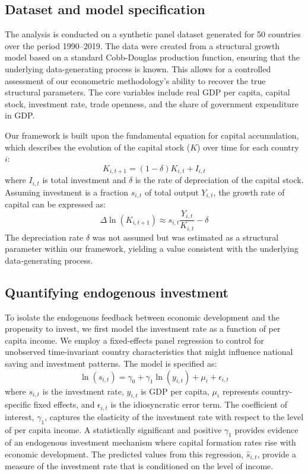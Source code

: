 \documentclass[]{article}
\begin{document}
\subsection{Dataset and model specification}
The analysis is conducted on a synthetic panel dataset generated for 50 countries over the period 1990--2019. The data were created from a structural growth model based on a standard Cobb-Douglas production function, ensuring that the underlying data-generating process is known. This allows for a controlled assessment of our econometric methodology's ability to recover the true structural parameters. The core variables include real GDP per capita, capital stock, investment rate, trade openness, and the share of government expenditure in GDP.

Our framework is built upon the fundamental equation for capital accumulation, which describes the evolution of the capital stock ($K$) over time for each country $i$:
\begin{equation}
K_{i,t+1} = (1-\delta)K_{i,t} + I_{i,t}
\end{equation}
where $I_{i,t}$ is total investment and $\delta$ is the rate of depreciation of the capital stock. Assuming investment is a fraction $s_{i,t}$ of total output $Y_{i,t}$, the growth rate of capital can be expressed as:
\begin{equation}
\Delta \ln(K_{i,t+1}) \approx s_{i,t} \frac{Y_{i,t}}{K_{i,t}} - \delta
\end{equation}
The depreciation rate $\delta$ was not assumed but was estimated as a structural parameter within our framework, yielding a value consistent with the underlying data-generating process.

\subsection{Quantifying endogenous investment}
To isolate the endogenous feedback between economic development and the propensity to invest, we first model the investment rate as a function of per capita income. We employ a fixed-effects panel regression to control for unobserved time-invariant country characteristics that might influence national saving and investment patterns. The model is specified as:
\begin{equation}
\ln(s_{i,t}) = \gamma_0 + \gamma_1 \ln(y_{i,t}) + \mu_i + \epsilon_{i,t}
\end{equation}
where $s_{i,t}$ is the investment rate, $y_{i,t}$ is GDP per capita, $\mu_i$ represents country-specific fixed effects, and $\epsilon_{i,t}$ is the idiosyncratic error term. The coefficient of interest, $\gamma_1$, captures the elasticity of the investment rate with respect to the level of per capita income. A statistically significant and positive $\gamma_1$ provides evidence of an endogenous investment mechanism where capital formation rates rise with economic development. The predicted values from this regression, $\hat{s}_{i,t}$, provide a measure of the investment rate that is conditioned on the level of income.
\end{document}
